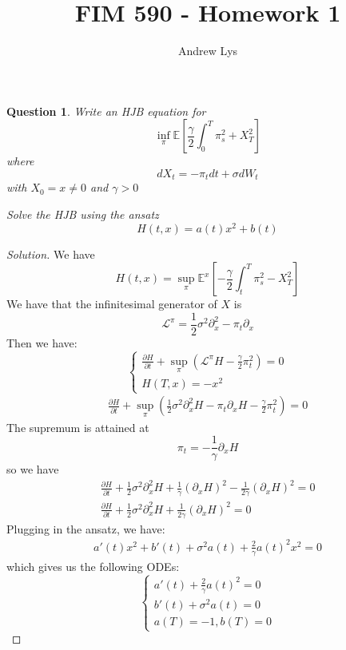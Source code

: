 \documentclass{amsart}
\title{FIM 590 - Homework 1}
\author{Andrew Lys}
\newtheorem{theorem}{Question}
\begin{document}
\maketitle
\begin{theorem}
    Write an HJB equation for 
    \[
    \inf_{\pi}\mathbb{E}\left[
        \frac{\gamma}{2} \int_0^T \pi_s^2 + X_T^2
    \right]
    \]
    where 
    \[
    d X_t = - \pi_t dt + \sigma d W_t
    \]
    with $X_0 = x \neq 0$ and $\gamma > 0$

    Solve the HJB using the ansatz 
    \[
    H(t,x) = a(t) x^2 + b(t)
    \]
\end{theorem}
\begin{proof}[Solution]
   We have 
   \[
   H(t, x) = \sup_\pi \mathbb{E}^x \left[
   -\frac{\gamma}{2} \int_t^T \pi_s^2 - X_T^2
   \right]
   \] 
   We have that the infinitesimal generator of $X$ is 
   \[
   \mathcal{L}^\pi = \frac{1}{2}\sigma^2 \partial^2_x -\pi_t \partial_x
   \]
   Then we have: 
   \[
   \begin{cases}
    \frac{\partial H}{\partial t} + \sup_{\pi} \left(
        \mathcal{L}^\pi H - \frac{\gamma}{2} \pi_t^2  
    \right) = 0\\
    H(T, x) = -x^2
   \end{cases}
   \]
   \begin{align*}
    \frac{\partial H}{\partial t} + \sup_{\pi} \left(
        \frac12 \sigma^2 \partial^2_x H - \pi_t \partial_x H - \frac{\gamma}{2} \pi_t^2  
    \right) = 0
   \end{align*}
   The supremum is attained at 
   \[
   \pi_t = -\frac{1}{\gamma} \partial_x H
   \]
   so we have
   \begin{align*}
    \frac{\partial H}{\partial t} + \frac{1}{2}\sigma^2 \partial^2_x H + \frac{1}{\gamma} (\partial_x H)^2 - \frac{1}{2\gamma} (\partial_x H)^2 = 0\\
    \frac{\partial H}{\partial t} + \frac{1}{2}\sigma^2 \partial^2_x H + \frac{1}{2\gamma} (\partial_x H)^2 = 0
   \end{align*}
   Plugging in the ansatz, we have: 
   \begin{align*}
   a'(t) x^2 + b'(t) + \sigma^2 a(t) + \frac{2}{\gamma}a(t)^2 x^2 = 0
   \end{align*}
   which gives us the following ODEs: 
   \[
   \begin{cases}
    a'(t) + \frac{2}{\gamma} a(t)^2 = 0\\
    b'(t) + \sigma^2 a(t) = 0\\
    a(T) = -1, b(T) = 0
   \end{cases}
\]
\end{proof}
\end{document}
